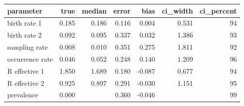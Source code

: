 \begin{table}[ht]
\centering
\begin{tabular}{lrrrrrr}
  \hline
parameter & true & median & error & bias & ci\_width & ci\_percent \\ 
  \hline
birth rate 1 & 0.185 & 0.186 & 0.116 & 0.004 & 0.531 & 94 \\ 
  birth rate 2 & 0.092 & 0.095 & 0.337 & 0.032 & 1.386 & 93 \\ 
  sampling rate & 0.008 & 0.010 & 0.351 & 0.275 & 1.811 & 92 \\ 
  occurrence rate & 0.046 & 0.052 & 0.248 & 0.140 & 1.209 & 96 \\ 
  R effective 1 & 1.850 & 1.689 & 0.180 & -0.087 & 0.677 & 94 \\ 
  R effective 2 & 0.925 & 0.897 & 0.291 & -0.030 & 1.151 & 95 \\ 
  prevalence & 0.000 &  & 0.360 & -0.046 &  & 99 \\ 
   \hline
\end{tabular}
\end{table}
